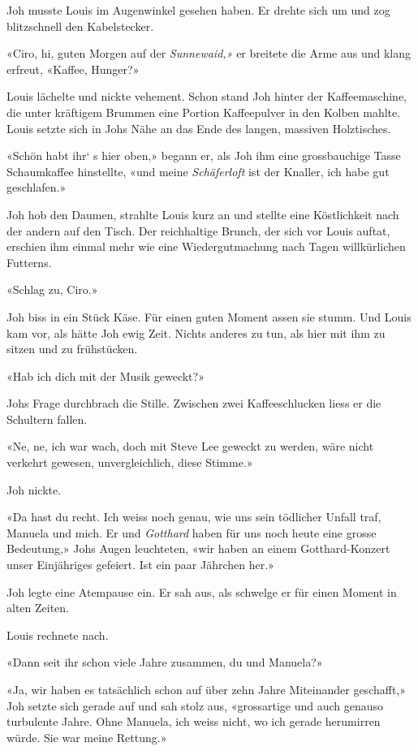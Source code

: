 Joh musste Louis im Augenwinkel gesehen haben. Er drehte sich um und zog
blitzschnell den Kabelstecker.

«Ciro, hi, guten Morgen auf der \emph{Sunnewaid,»} er breitete die Arme
aus und klang erfreut, «Kaffee, Hunger?»

Louis lächelte und nickte vehement. Schon stand Joh hinter der
Kaffeemaschine, die unter kräftigem Brummen eine Portion Kaffeepulver in
den Kolben mahlte. Louis setzte sich in Johs Nähe an das Ende des
langen, massiven Holztisches.

«Schön habt ihr` s hier oben,» begann er, als Joh ihm eine grossbauchige
Tasse Schaumkaffee hinstellte, «und meine \emph{Schäferloft} ist der
Knaller, ich habe gut geschlafen.»

Joh hob den Daumen, strahlte Louis kurz an und stellte eine Köstlichkeit
nach der andern auf den Tisch. Der reichhaltige Brunch, der sich vor
Louis auftat, erschien ihm einmal mehr wie eine Wiedergutmachung nach
Tagen willkürlichen Futterns.

«Schlag zu, Ciro.»

Joh biss in ein Stück Käse. Für einen guten Moment assen sie stumm. Und
Louis kam vor, als hätte Joh ewig Zeit. Nichts anderes zu tun, als hier
mit ihm zu sitzen und zu frühstücken.

«Hab ich dich mit der Musik geweckt?»

Johs Frage durchbrach die Stille. Zwischen zwei Kaffeeschlucken liess er
die Schultern fallen.

«Ne, ne, ich war wach, doch mit Steve Lee geweckt zu werden, wäre nicht
verkehrt gewesen, unvergleichlich, diese Stimme.»

Joh nickte.

«Da hast du recht. Ich weiss noch genau, wie uns sein tödlicher Unfall
traf, Manuela und mich. Er und \emph{Gotthard} haben für uns noch heute
eine grosse Bedeutung,» Johs Augen leuchteten, «wir haben an einem
Gotthard-Konzert unser Einjähriges gefeiert. Ist ein paar Jährchen her.»

Joh legte eine Atempause ein. Er sah aus, als schwelge er für einen
Moment in alten Zeiten.

Louis rechnete nach.

«Dann seit ihr schon viele Jahre zusammen, du und Manuela?»

«Ja, wir haben es tatsächlich schon auf über zehn Jahre Miteinander
geschafft,» Joh setzte sich gerade auf und sah stolz aus, «grossartige
und auch genauso turbulente Jahre. Ohne Manuela, ich weiss nicht, wo ich
gerade herumirren würde. Sie war meine Rettung.»

